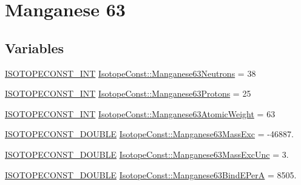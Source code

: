 \hypertarget{group___isotope_const-_manganese-_mn63}{}\section{Manganese 63}
\label{group___isotope_const-_manganese-_mn63}
\subsection*{Variables}
\begin{DoxyCompactItemize}
\item 
\mbox{\hyperlink{group___isotope_const-_macros_ga5f18360b3e99483a35c32d789e62621c}{I\+S\+O\+T\+O\+P\+E\+C\+O\+N\+S\+T\+\_\+\+I\+NT}} \mbox{\hyperlink{group___isotope_const-_manganese-_mn63_gaedfbbef015548d14688c2ea5fb154abc}{Isotope\+Const\+::\+Manganese63\+Neutrons}} = 38
\item 
\mbox{\hyperlink{group___isotope_const-_macros_ga5f18360b3e99483a35c32d789e62621c}{I\+S\+O\+T\+O\+P\+E\+C\+O\+N\+S\+T\+\_\+\+I\+NT}} \mbox{\hyperlink{group___isotope_const-_manganese-_mn63_ga1b09d94399131cdc514a0baf28d161a1}{Isotope\+Const\+::\+Manganese63\+Protons}} = 25
\item 
\mbox{\hyperlink{group___isotope_const-_macros_ga5f18360b3e99483a35c32d789e62621c}{I\+S\+O\+T\+O\+P\+E\+C\+O\+N\+S\+T\+\_\+\+I\+NT}} \mbox{\hyperlink{group___isotope_const-_manganese-_mn63_ga1bebbe915db9b2ea8343ab99ff8bf1b3}{Isotope\+Const\+::\+Manganese63\+Atomic\+Weight}} = 63
\item 
\mbox{\hyperlink{group___isotope_const-_macros_ga8f45a7272ce02c0b4c65c44636ed719a}{I\+S\+O\+T\+O\+P\+E\+C\+O\+N\+S\+T\+\_\+\+D\+O\+U\+B\+LE}} \mbox{\hyperlink{group___isotope_const-_manganese-_mn63_ga10165bbe003d03783eda1d513cc4f8e3}{Isotope\+Const\+::\+Manganese63\+Mass\+Exc}} = -\/46887.
\item 
\mbox{\hyperlink{group___isotope_const-_macros_ga8f45a7272ce02c0b4c65c44636ed719a}{I\+S\+O\+T\+O\+P\+E\+C\+O\+N\+S\+T\+\_\+\+D\+O\+U\+B\+LE}} \mbox{\hyperlink{group___isotope_const-_manganese-_mn63_ga0935588335c475b79b9eef7d5bcd8911}{Isotope\+Const\+::\+Manganese63\+Mass\+Exc\+Unc}} = 3.
\item 
\mbox{\hyperlink{group___isotope_const-_macros_ga8f45a7272ce02c0b4c65c44636ed719a}{I\+S\+O\+T\+O\+P\+E\+C\+O\+N\+S\+T\+\_\+\+D\+O\+U\+B\+LE}} \mbox{\hyperlink{group___isotope_const-_manganese-_mn63_gaa1f8f81db0973af7c08677655fe00bd2}{Isotope\+Const\+::\+Manganese63\+Bind\+E\+PerA}} = 8505.
\item 

\end{DoxyCompactItemize}
